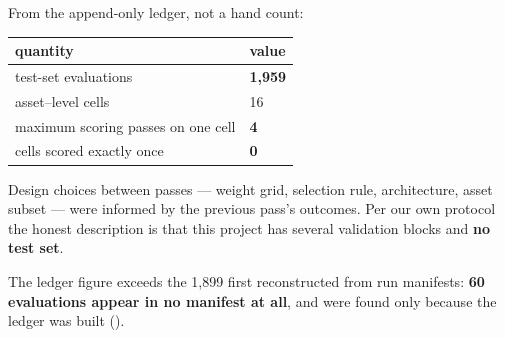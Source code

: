 From the append-only ledger, not a hand count:

\begin{longtable}[]{@{}ll@{}}
\toprule
quantity & value\tabularnewline
\midrule
\endhead
test-set evaluations & \textbf{1,959}\tabularnewline
asset--level cells & 16\tabularnewline
maximum scoring passes on one cell & \textbf{4}\tabularnewline
cells scored exactly once & \textbf{0}\tabularnewline
\bottomrule
\end{longtable}

Design choices between passes --- weight grid, selection rule, architecture, asset subset --- were
informed by the previous pass's outcomes. Per our own protocol the honest description is that
this project has several validation blocks and \textbf{no test set}.

The ledger figure exceeds the 1,899 first reconstructed from run manifests: \textbf{60 evaluations
appear in no manifest at all}, and were found only because the ledger was built ().
